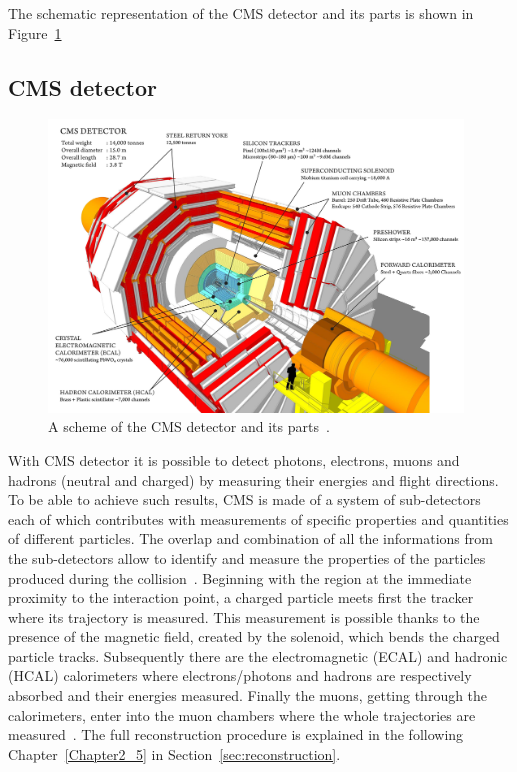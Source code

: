 The schematic representation of the CMS detector and its parts is
shown in Figure~\ref{fig:detector}


\subsection{CMS detector}\label{sec:cmsdetector}
\begin{figure}[h]
\centering
\includegraphics[width=0.98\textwidth]{Figures/c2/cms_160312_06-compressed.pdf}
\vspace*{3mm}
\caption{A scheme of the CMS detector and its parts~\cite{webpage_cms}.}
\label{fig:detector}
\end{figure} 
With CMS detector it is possible to detect photons, electrons, muons
and hadrons (neutral and charged) by measuring their energies and flight
directions. 
To be able to achieve such results, CMS is made of a system of sub-detectors each of which contributes with
measurements of specific properties and quantities of different 
particles. The overlap and combination of all the
informations from the sub-detectors allow to identify and measure the
properties of the particles produced during the collision~\cite{CMS:particleflow}. Beginning
with the region at the immediate proximity to the interaction point, a
charged particle meets first the tracker where its trajectory is
measured. This measurement is possible thanks to the presence of the
magnetic field, created by the solenoid, which bends the charged
particle tracks. Subsequently there are the
electromagnetic (ECAL) and hadronic (HCAL) calorimeters where
electrons/photons and hadrons are respectively absorbed and their
energies measured. Finally the muons, getting through the
calorimeters, enter into the muon chambers where the whole trajectories
are measured~\cite{CMS:particleflow}. The full reconstruction
procedure is explained in the following Chapter~\ref{Chapter2_5} in Section~\ref{sec:reconstruction}.\\

